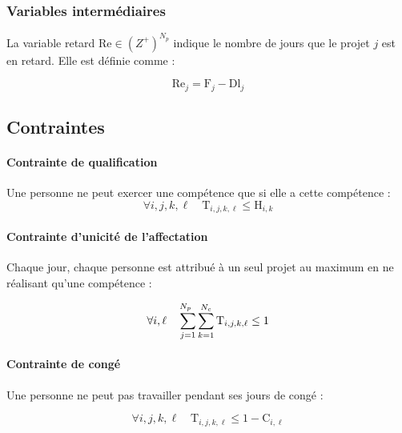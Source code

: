 \documentclass[12pt, a4paper, english, version=last, parskip=half, titlepage]{scrartcl}
\begin{document}
\subsubsection{Variables intermédiaires}
\par La variable retard $\text{Re} \in (Z^{+})^{N_p}$ indique le nombre de jours que le projet $j$ est en retard. Elle est définie comme :

\begin{equation*}
\text{Re}_j = \text{F}_j - \text{Dl}_j
\end{equation*}

\subsection{Contraintes}

\paragraph{Contrainte de qualification}
Une personne ne peut exercer une compétence que si elle a cette compétence :
\begin{equation*}
    \forall i, j, k, \ell \quad \text{T}_{i, j, k, \ell} \leq \text{H}_{i, k}
\end{equation*}

\paragraph{Contrainte d’unicité de l’affectation}
Chaque jour, chaque personne est attribué à un seul projet au maximum en ne réalisant qu'une compétence :

\begin{equation*}
    \forall i, \ell \quad \sum_{j=1}^{\mathclap{N_p} \hspace{1ex}}\sum_{k=1}^{\mathclap{N_c}} \text{T}_{i, j, k, \ell} \leq 1
\end{equation*}

\paragraph{Contrainte de congé}
Une personne ne peut pas travailler pendant ses jours de congé :

\begin{equation*}
    \forall i, j, k, \ell \quad \text{T}_{i,j,k,\ell} \le 1 - \text{C}_{i,\ell}
\end{equation*}

\end{document}
